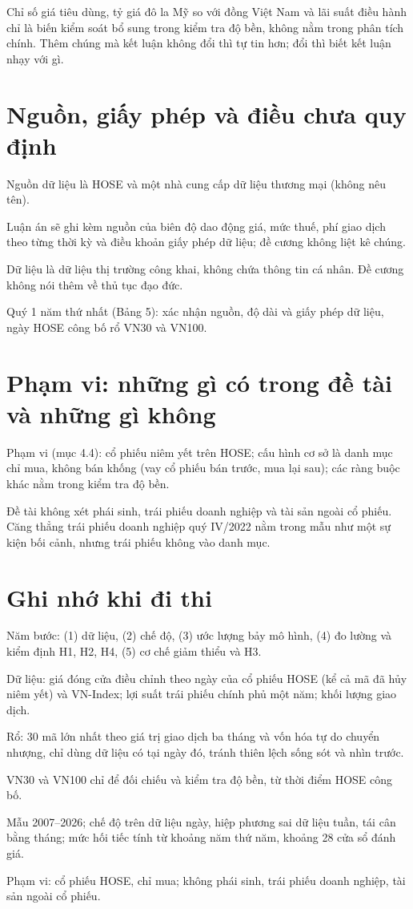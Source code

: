 Chỉ số giá tiêu dùng, tỷ giá đô la Mỹ so với đồng Việt Nam và lãi suất điều hành chỉ là biến kiểm soát bổ sung trong kiểm tra độ bền, không nằm trong phân tích chính. Thêm chúng mà kết luận không đổi thì tự tin hơn; đổi thì biết kết luận nhạy với gì.

\section{Nguồn, giấy phép và điều chưa quy định}

Nguồn dữ liệu là HOSE và một nhà cung cấp dữ liệu thương mại (không nêu tên).

Luận án sẽ ghi kèm nguồn của biên độ dao động giá, mức thuế, phí giao dịch theo từng thời kỳ và điều khoản giấy phép dữ liệu; đề cương không liệt kê chúng.

Dữ liệu là dữ liệu thị trường công khai, không chứa thông tin cá nhân. Đề cương không nói thêm về thủ tục đạo đức.

Quý 1 năm thứ nhất (Bảng 5): xác nhận nguồn, độ dài và giấy phép dữ liệu, ngày HOSE công bố rổ VN30 và VN100.

\section{Phạm vi: những gì có trong đề tài và những gì không}

Phạm vi (mục 4.4): cổ phiếu niêm yết trên HOSE; cấu hình cơ sở là danh mục chỉ mua, không bán khống (vay cổ phiếu bán trước, mua lại sau); các ràng buộc khác nằm trong kiểm tra độ bền.

Đề tài không xét phái sinh, trái phiếu doanh nghiệp và tài sản ngoài cổ phiếu. Căng thẳng trái phiếu doanh nghiệp quý IV/2022 nằm trong mẫu như một sự kiện bối cảnh, nhưng trái phiếu không vào danh mục.

\section{Ghi nhớ khi đi thi}

\begin{tcolorbox}[breakable]
Năm bước: (1) dữ liệu, (2) chế độ, (3) ước lượng bảy mô hình, (4) đo lường và kiểm định H1, H2, H4, (5) cơ chế giảm thiểu và H3.

Dữ liệu: giá đóng cửa điều chỉnh theo ngày của cổ phiếu HOSE (kể cả mã đã hủy niêm yết) và VN-Index; lợi suất trái phiếu chính phủ một năm; khối lượng giao dịch.

Rổ: 30 mã lớn nhất theo giá trị giao dịch ba tháng và vốn hóa tự do chuyển nhượng, chỉ dùng dữ liệu có tại ngày đó, tránh thiên lệch sống sót và nhìn trước.

VN30 và VN100 chỉ để đối chiếu và kiểm tra độ bền, từ thời điểm HOSE công bố.

Mẫu 2007--2026; chế độ trên dữ liệu ngày, hiệp phương sai dữ liệu tuần, tái cân bằng tháng; mức hối tiếc tính từ khoảng năm thứ năm, khoảng 28 cửa sổ đánh giá.

Phạm vi: cổ phiếu HOSE, chỉ mua; không phái sinh, trái phiếu doanh nghiệp, tài sản ngoài cổ phiếu.
\end{tcolorbox}

